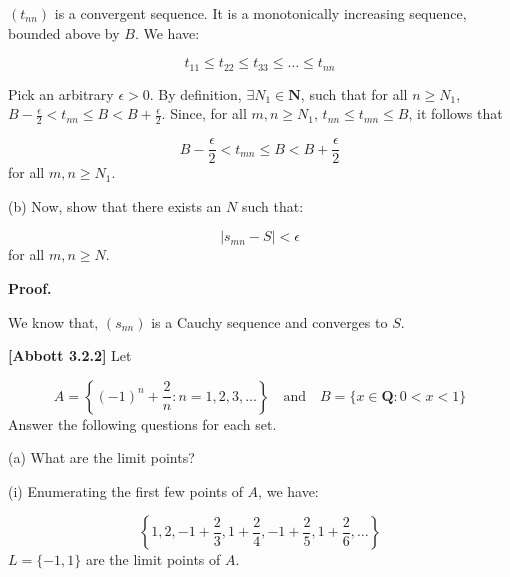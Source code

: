 \documentclass[10pt]{article}
\begin{document}
$\displaystyle ( t_{nn})$ is a convergent sequence. It is a monotonically increasing sequence, bounded above by $\displaystyle B$. We have:


\begin{equation*}
t_{11} \leq t_{22} \leq t_{33} \leq \dotsc \leq t_{nn}
\end{equation*}


Pick an arbitrary $\displaystyle \epsilon  >0$. By definition, $\displaystyle \exists N_{1} \in \mathbf{N}$, such that for all $\displaystyle n\geq N_{1}$, $\displaystyle B-\frac{\epsilon }{2} < t_{nn} \leq B< B+\frac{\epsilon }{2}$. Since, for all $\displaystyle m,n\geq N_{1}$, $\displaystyle t_{nn} \leq t_{mn} \leq B$, it follows that 


\begin{equation*}
B-\frac{\epsilon }{2} < t_{mn} \leq B< B+\frac{\epsilon }{2}
\end{equation*}
 for all $\displaystyle m,n\geq N_{1}$.



(b) Now, show that there exists an $\displaystyle N$ such that:


\begin{equation*}
|s_{mn} -S|< \epsilon 
\end{equation*}
for all $\displaystyle m,n\geq N$.



\textbf{Proof.}



We know that, $\displaystyle ( s_{nn})$ is a Cauchy sequence and converges to $\displaystyle S$. 







\textbf{[Abbott 3.2.2]} Let 


\begin{equation*}
A=\left\{( -1)^{n} +\frac{2}{n} :n=1,2,3,\dotsc \right\} \quad \text{and} \quad B=\{x\in \mathbf{Q} :0< x< 1\}
\end{equation*}
Answer the following questions for each set.



(a) What are the limit points?



(i) Enumerating the first few points of $\displaystyle A$, we have:


\begin{equation*}
\left\{1,2,-1+\frac{2}{3} ,1+\frac{2}{4} ,-1+\frac{2}{5} ,1+\frac{2}{6} ,\dotsc \right\}
\end{equation*}
$\displaystyle L=\{-1,1\}$ are the limit points of $\displaystyle A$.
\end{document}
